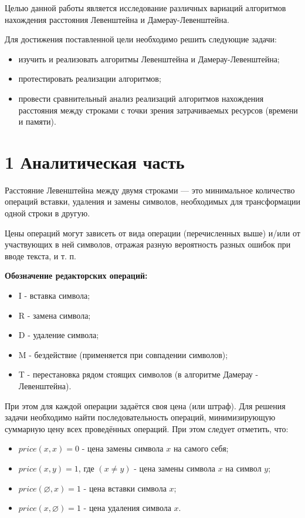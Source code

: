 \documentclass[12pt, a4paper]{report}
\begin{document}
Целью данной работы является исследование различных вариаций алгоритмов нахождения расстояния Левенштейна и Дамерау-Левенштейна.

Для достижения поставленной цели необходимо решить следующие задачи:
\begin{itemize}
  	\item изучить и реализовать алгоритмы Левенштейна и Дамерау-Левенштейна;
	\item протестировать реализации алгоритмов;
	\item провести сравнительный анализ реализаций алгоритмов нахождения расстояния между строками с точки зрения затрачиваемых ресурсов (времени и памяти).
\end{itemize}

\newpage
\chapter*{1 Аналитическая часть}

Расстояние Левенштейна между двумя строками — это минимальное количество операций вставки, удаления и замены символов, необходимых для трансформации одной строки в другую.

Цены операций могут зависеть от вида операции (перечисленных выше) и/или от участвующих в ней символов, отражая разную вероятность разных ошибок при вводе текста, и т. п.\newline
 
\textbf{Обозначение редакторских операций:} 
\begin{itemize}
\item I - вставка символа;
	\item R - замена символа;
	\item D - удаление символа;
	\item M - бездействие (применяется при совпадении символов);
	\item T - перестановка рядом стоящих символов (в алгоритме Дамерау - Левенштейна).
\end{itemize}

При этом для каждой операции задаётся своя цена (или штраф). Для решения задачи необходимо найти последовательность операций, минимизирующую суммарную цену всех проведённых операций. При этом следует отметить, что:
\begin{itemize}
	\item $price(x, x) = 0$ - цена замены символа $x$ на самого себя;
	\item $price(x, y) = 1$, где $(x \neq y)$ - цена замены символа $x$ на символ $y$;
	\item $price(\varnothing, x) = 1$ - цена вставки символа $x$;
	\item $price(x, \varnothing) = 1$ - цена удаления символа $x$.
\end{itemize}
\end{document}

